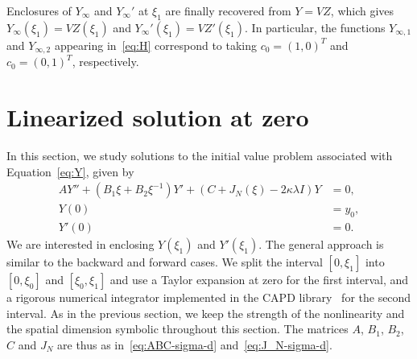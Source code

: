 \documentclass[11pt]{article}
\begin{document}
Enclosures of \(Y_{\infty}\) and \(Y_{\infty}'\) at \(\xi_{1}\) are
finally recovered from \(Y = VZ\), which gives
\(Y_{\infty}(\xi_{1}) = VZ(\xi_{1})\) and
\(Y_{\infty}'(\xi_{1}) = VZ'(\xi_{1})\). In particular, the functions
\(Y_{\infty,1}\) and \(Y_{\infty,2}\) appearing in~\eqref{eq:H}
correspond to taking \(c_{0} = (1, 0)^{T}\) and
\(c_{0} = (0, 1)^{T}\), respectively.

\section{Linearized solution at zero}
\label{sec:linearized-solution-zero}

In this section, we study solutions to the initial value problem
associated with Equation~\eqref{eq:Y}, given by
\begin{align}
  \label{eq:Y-zero}
  AY'' + (B_{1}\xi + B_{2}\xi^{-1})Y' + (C + J_{N}(\xi) - 2\kappa\lambda I)Y &= 0,\\
  Y(0) &= y_{0},\nonumber\\
  Y'(0) &= 0.\nonumber
\end{align}
We are interested in enclosing \(Y(\xi_{1})\) and \(Y'(\xi_{1})\). The
general approach is similar to the backward and forward cases. We
split the interval \([0, \xi_{1}]\) into \([0, \xi_{0}]\) and
\([\xi_{0}, \xi_{1}]\) and use a Taylor expansion at zero for the
first interval, and a rigorous numerical integrator implemented in the
CAPD library~\cite{Kapela2021} for the second interval. As in the
previous section, we keep the strength of the nonlinearity and the
spatial dimension symbolic throughout this section. The matrices
\(A\), \(B_{1}\), \(B_{2}\), \(C\) and \(J_{N}\) are thus as
in~\eqref{eq:ABC-sigma-d} and~\eqref{eq:J_N-sigma-d}.
\end{document}
